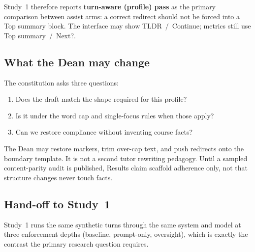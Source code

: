 Study~1 therefore reports \textbf{turn-aware (profile) pass} as the primary
comparison between assist arms: a correct redirect should not be forced into
a Top summary block. The interface may show TLDR~/~Continue; metrics still
use Top summary~/~Next?.

\subsection{What the Dean may change}

The constitution asks three questions:
\begin{enumerate}
  \item Does the draft match the shape required for this profile?
  \item Is it under the word cap and single-focus rules when those apply?
  \item Can we restore compliance without inventing course facts?
\end{enumerate}

The Dean may restore markers, trim over-cap text, and push redirects onto the
boundary template. It is not a second tutor rewriting pedagogy. Until a
sampled content-parity audit is published, Results claim scaffold adherence
only, not that structure changes never touch facts.

\subsection{Hand-off to Study~1}

Study~1 runs the same synthetic turns through the same system and model at
three enforcement depths (baseline, prompt-only, oversight), which is exactly
the contrast the primary research question requires.
